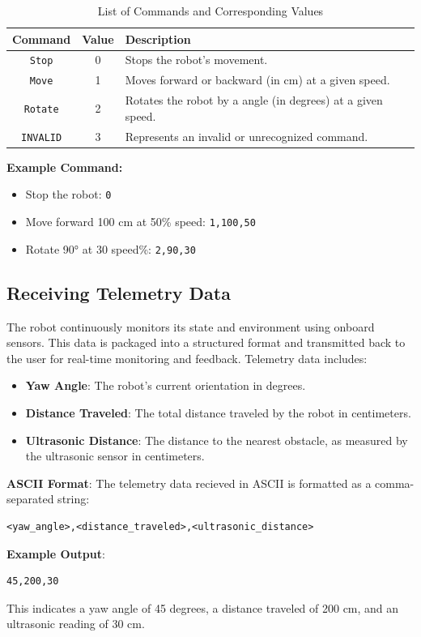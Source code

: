 \begin{table}[H]
	\centering
	\caption{List of Commands and Corresponding Values}
	\label{tab:commands}
	\begin{tabular}{|c|c|l|}
		\hline
		\textbf{Command} & \textbf{Value} & \textbf{Description} \\ \hline
		\texttt{Stop}     & 0              & Stops the robot's movement. \\ \hline
		\texttt{Move}     & 1              & Moves forward or backward (in cm) at a given speed. \\ \hline
		\texttt{Rotate}   & 2              & Rotates the robot by a angle (in degrees) at a given speed. \\ \hline
		\texttt{INVALID}  & 3              & Represents an invalid or unrecognized command. \\ \hline
	\end{tabular}
\end{table}

\textbf{Example Command:}
\begin{itemize}
	\item Stop the robot: \texttt{0}
	\item Move forward 100 cm at 50\% speed:  \texttt{1,100,50}
	\item Rotate 90° at 30 speed\%: \texttt{2,90,30}
\end{itemize}

\subsection{Receiving Telemetry Data}
The robot continuously monitors its state and environment using onboard sensors. This data is packaged into a structured format and transmitted back to the user for real-time monitoring and feedback. Telemetry data includes:
\begin{itemize}
	\item \textbf{Yaw Angle}: The robot's current orientation in degrees.
	\item \textbf{Distance Traveled}: The total distance traveled by the robot in centimeters.
	\item \textbf{Ultrasonic Distance}: The distance to the nearest obstacle, as measured by the ultrasonic sensor in centimeters.
\end{itemize}

\textbf{ASCII Format}:
The telemetry data recieved in ASCII is formatted as a comma-separated string:
\begin{lstlisting}[]
	<yaw_angle>,<distance_traveled>,<ultrasonic_distance>
\end{lstlisting}
\textbf{Example Output}:
\begin{lstlisting}[]
	45,200,30
\end{lstlisting}

This indicates a yaw angle of 45 degrees, a distance traveled of 200 cm, and an ultrasonic reading of 30 cm.
